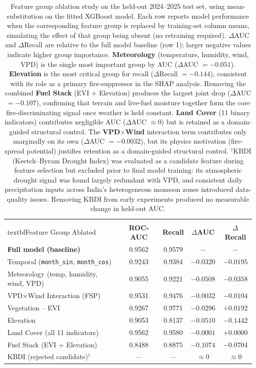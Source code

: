 \begin{table}[H]
\centering
\setlength{\tabcolsep}{5pt}
\renewcommand{\arraystretch}{1.25}
\begin{tabular}{lcccc}
\toprule
\\textbf{Feature Group Ablated} & \textbf{ROC-AUC} & \textbf{Recall} & \textbf{$\Delta$AUC} & \textbf{$\Delta$Recall} \\
\midrule
\textbf{Full model (baseline)} & 0.9562 & 0.9579 & $-$ & $-$ \\
Temporal (\texttt{month\_sin}, \texttt{month\_cos}) & 0.9243 & 0.9384 & $-0.0320$ & $-0.0195$ \\
Meteorology (temp, humidity, wind, VPD) & 0.9055 & 0.9221 & $-0.0508$ & $-0.0358$ \\
VPD$\times$Wind Interaction (FSP) & 0.9531 & 0.9476 & $-0.0032$ & $-0.0104$ \\
Vegetation -- EVI & 0.9267 & 0.9771 & $-0.0296$ & $+0.0192$ \\
Elevation & 0.9053 & 0.8137 & $-0.0510$ & $-0.1442$ \\
Land Cover (all 11 indicators) & 0.9562 & 0.9580 & $-0.0001$ & $+0.0000$ \\
Fuel Stack (EVI + Elevation) & 0.8488 & 0.8875 & $-0.1074$ & $-0.0704$ \\
\midrule
KBDI (rejected candidate)$^\dagger$ & --- & --- & $\approx 0$ & $\approx 0$ \\
\bottomrule
\end{tabular}
\caption{Feature group ablation study on the held-out 2024--2025 test set, using mean-substitution on the fitted XGBoost model. Each row reports model performance when the corresponding feature group is replaced by training-set column means, simulating the effect of that group being absent (no retraining required). $\Delta$AUC and $\Delta$Recall are relative to the full model baseline (row 1); larger negative values indicate higher group importance. \textbf{Meteorology} (temperature, humidity, wind, VPD) is the single most important group by AUC ($\Delta$AUC $= -0.051$). \textbf{Elevation} is the most critical group for recall ($\Delta$Recall $= -0.144$), consistent with its role as a primary fire-suppressor in the SHAP analysis. Removing the combined \textbf{Fuel Stack} (EVI + Elevation) produces the largest joint drop ($\Delta$AUC $= -0.107$), confirming that terrain and live-fuel moisture together form the core fire-discriminating signal once weather is held constant. \textbf{Land Cover} (11 binary indicators) contributes negligible AUC ($\Delta$AUC $\approx 0$) but is retained as a domain-guided structural control. The \textbf{VPD$\times$Wind} interaction term contributes only marginally on its own ($\Delta$AUC $= -0.0032$), but its physics motivation (fire-spread potential) justifies retention as a domain-guided structural control. $^\dagger$KBDI (Keetch--Byram Drought Index) was evaluated as a candidate feature during feature selection but excluded prior to final model training: its atmospheric drought signal was found largely redundant with VPD, and consistent daily precipitation inputs across India's heterogeneous monsoon zones introduced data-quality issues. Removing KBDI from early experiments produced no measurable change in held-out AUC.}

\end{table}

